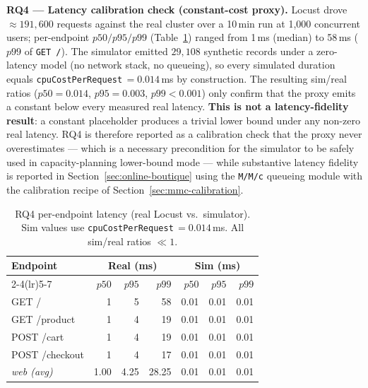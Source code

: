 \documentclass[ASNA,twocolumn]{USG}
\begin{document}
    \textbf{RQ4 --- Latency calibration check (constant-cost proxy).}
    Locust drove $\approx\!191{,}600$ requests against the real cluster
    over a 10\,min run at 1{,}000 concurrent users; per-endpoint
    $p50/p95/p99$ (Table~\ref{tab:rq4-latency}) ranged from 1\,ms (median)
    to 58\,ms ($p99$ of \texttt{GET /}). The simulator emitted
    $29{,}108$ synthetic records under a zero-latency model (no network
    stack, no queueing),
    so every simulated duration equals
    \texttt{cpuCostPerRequest}\,$=0.014$\,ms by construction. The
    resulting sim/real ratios ($p50{=}0.014$, $p95{=}0.003$,
    $p99{<}0.001$) only confirm that the proxy emits a constant below
    every measured real latency. \textbf{This is not a latency-fidelity
    result}: a constant placeholder produces a trivial lower bound under
    any non-zero real latency. RQ4 is therefore reported as a calibration
    check that the proxy never overestimates --- which is a necessary
    precondition for the simulator to be safely used in
    capacity-planning lower-bound mode --- while substantive latency
    fidelity is reported in Section~\ref{sec:online-boutique} using the
    \texttt{M/M/c} queueing module with the calibration recipe of
    Section~\ref{sec:mmc-calibration}.

    \begin{table}[!t]
        \centering
        \caption{RQ4 per-endpoint latency (real Locust vs.\ simulator).
        Sim values use \texttt{cpuCostPerRequest}\,$=0.014$\,ms.
        All sim/real ratios $\ll 1$.\label{tab:rq4-latency}}
        \setlength{\tabcolsep}{4pt}
        \begin{tabular}{lrrrrrr}
            \toprule
            \textbf{Endpoint} & \multicolumn{3}{c}{\textbf{Real (ms)}} & \multicolumn{3}{c}{\textbf{Sim (ms)}} \\
            \cmidrule(lr){2-4}\cmidrule(lr){5-7}
            & $p50$ & $p95$ & $p99$ & $p50$ & $p95$ & $p99$ \\
            \midrule
            GET /          & 1 & 5 & 58 & 0.01 & 0.01 & 0.01 \\
            GET /product   & 1 & 4 & 19 & 0.01 & 0.01 & 0.01 \\
            POST /cart     & 1 & 4 & 19 & 0.01 & 0.01 & 0.01 \\
            POST /checkout & 1 & 4 & 17 & 0.01 & 0.01 & 0.01 \\
            \midrule
            \textit{web (avg)} & 1.00 & 4.25 & 28.25 & 0.01 & 0.01 & 0.01 \\
            \bottomrule
        \end{tabular}
    \end{table}
\end{document}
